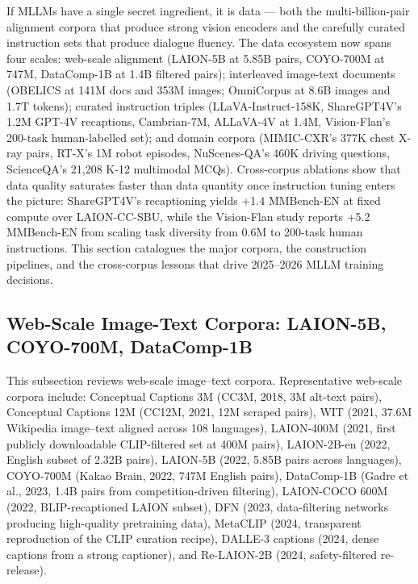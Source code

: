 If MLLMs have a single secret ingredient, it is data --- both the multi-billion-pair alignment corpora that produce strong vision encoders and the carefully curated instruction sets that produce dialogue fluency. The data ecosystem now spans four scales: web-scale alignment (LAION-5B at 5.85B pairs, COYO-700M at 747M, DataComp-1B at 1.4B filtered pairs); interleaved image-text documents (OBELICS at 141M docs and 353M images; OmniCorpus at 8.6B images and 1.7T tokens); curated instruction triples (LLaVA-Instruct-158K, ShareGPT4V's 1.2M GPT-4V recaptions, Cambrian-7M, ALLaVA-4V at 1.4M, Vision-Flan's 200-task human-labelled set); and domain corpora (MIMIC-CXR's 377K chest X-ray pairs, RT-X's 1M robot episodes, NuScenes-QA's 460K driving questions, ScienceQA's 21,208 K-12 multimodal MCQs). Cross-corpus ablations show that data quality saturates faster than data quantity once instruction tuning enters the picture: ShareGPT4V's recaptioning yields +1.4 MMBench-EN at fixed compute over LAION-CC-SBU, while the Vision-Flan study reports +5.2 MMBench-EN from scaling task diversity from 0.6M to 200-task human instructions. This section catalogues the major corpora, the construction pipelines, and the cross-corpus lessons that drive 2025--2026 MLLM training decisions.

\subsection{Web-Scale Image-Text Corpora: LAION-5B, COYO-700M, DataComp-1B}\label{web-scale-image-text-corpora-laion-5b-coyo-700m-datacomp-1b}

This subsection reviews web-scale image--text corpora. Representative web-scale corpora include: Conceptual Captions 3M (CC3M, 2018, 3M alt-text pairs), Conceptual Captions 12M (CC12M, 2021, 12M scraped pairs), WIT (2021, 37.6M Wikipedia image--text aligned across 108 languages), LAION-400M (2021, first publicly downloadable CLIP-filtered set at 400M pairs), LAION-2B-en (2022, English subset of 2.32B pairs), LAION-5B (2022, 5.85B pairs across languages), COYO-700M (Kakao Brain, 2022, 747M English pairs), DataComp-1B (Gadre et al., 2023, 1.4B pairs from competition-driven filtering), LAION-COCO 600M (2022, BLIP-recaptioned LAION subset), DFN (2023, data-filtering networks producing high-quality pretraining data), MetaCLIP (2024, transparent reproduction of the CLIP curation recipe), DALLE-3 captions (2024, dense captions from a strong captioner), and Re-LAION-2B (2024, safety-filtered re-release).

